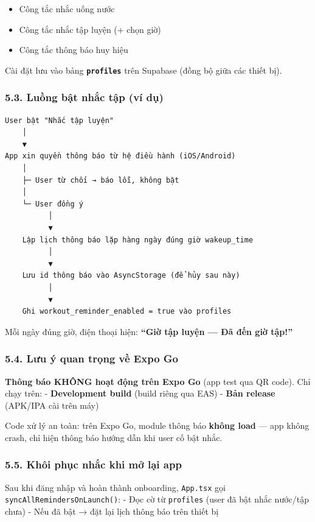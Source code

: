 \documentclass[12pt,a4paper]{article}
\begin{document}
\begin{itemize}
\tightlist
\item
  Công tắc nhắc uống nước
\item
  Công tắc nhắc tập luyện (+ chọn giờ)
\item
  Công tắc thông báo huy hiệu
\end{itemize}

Cài đặt lưu vào bảng \textbf{\texttt{profiles}} trên Supabase (đồng bộ
giữa các thiết bị).

\subsubsection{5.3. Luồng bật nhắc tập (ví
dụ)}\label{luux1ed3ng-bux1eadt-nhux1eafc-tux1eadp-vuxed-dux1ee5}

\begin{verbatim}
User bật "Nhắc tập luyện"
    │
    ▼
App xin quyền thông báo từ hệ điều hành (iOS/Android)
    │
    ├─ User từ chối → báo lỗi, không bật
    │
    └─ User đồng ý
          │
          ▼
    Lập lịch thông báo lặp hàng ngày đúng giờ wakeup_time
          │
          ▼
    Lưu id thông báo vào AsyncStorage (để hủy sau này)
          │
          ▼
    Ghi workout_reminder_enabled = true vào profiles
\end{verbatim}

Mỗi ngày đúng giờ, điện thoại hiện: \textbf{``Giờ tập luyện --- Đã đến
giờ tập!''}

\subsubsection{5.4. Lưu ý quan trọng về Expo
Go}\label{lux1b0u-uxfd-quan-trux1ecdng-vux1ec1-expo-go}

\textbf{Thông báo KHÔNG hoạt động trên Expo Go} (app test qua QR code).
Chỉ chạy trên: - \textbf{Development build} (build riêng qua EAS) -
\textbf{Bản release} (APK/IPA cài trên máy)

Code xử lý an toàn: trên Expo Go, module thông báo \textbf{không load}
--- app không crash, chỉ hiện thông báo hướng dẫn khi user cố bật nhắc.

\subsubsection{5.5. Khôi phục nhắc khi mở lại
app}\label{khuxf4i-phux1ee5c-nhux1eafc-khi-mux1edf-lux1ea1i-app}

Sau khi đăng nhập và hoàn thành onboarding, \texttt{App.tsx} gọi
\texttt{syncAllRemindersOnLaunch()}: - Đọc cờ từ \texttt{profiles} (user
đã bật nhắc nước/tập chưa) - Nếu đã bật → đặt lại lịch thông báo trên
thiết bị
\end{document}
